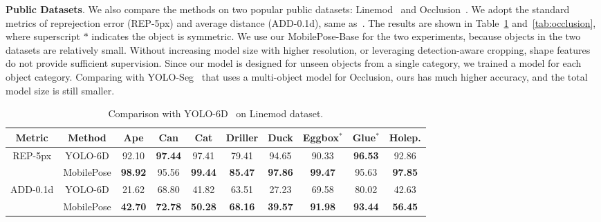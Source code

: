 \documentclass[runningheads]{llncs}
\begin{document}
\textbf{Public Datasets}. We also compare the methods on two popular public datasets: Linemod~\cite{Hinterstoisser_2012_LINEMOD} and Occlusion~\cite{Brachmann_2014_Occlusion}. We adopt the standard metrics of reprejection error (REP-5px) and average distance (ADD-0.1d), same as~\cite{Tekin_2018_SingleShot,Hu_2019_Segmentation}. The results are shown in Table~\ref{tab:linemod} and~\ref{tab:occlusion}, where superscript $*$ indicates the object is symmetric. We use our MobilePose-Base for the two experiments, because objects in the two datasets are relatively small. Without increasing model size with higher resolution, or leveraging detection-aware cropping, shape features do not provide sufficient supervision. Since our model is designed for unseen objects from a single category, we trained a model for each object category. Comparing with YOLO-Seg~\cite{Hu_2019_Segmentation} that uses a multi-object model for Occlusion, ours has much higher accuracy, and the total model size is still smaller.

\begin{table}[t]
\begin{center}
\begin{tabular}{c|c||c|c|c|c|c|c|c|c}\hline
Metric & Method & Ape & Can & Cat & Driller & Duck & Eggbox$^*$ & Glue$^*$ & Holep.\\
\hline
\multirow{2}{*}{REP-5px} &
YOLO-6D &  92.10 & \textbf{97.44} & 97.41 & 79.41 & 94.65 & 90.33 & \textbf{96.53} & 92.86 \\
&MobilePose & \textbf{98.92} & 95.56 & \textbf{99.44} & \textbf{85.47} & \textbf{97.86} & \textbf{99.47} & 95.63 & \textbf{97.85}\\
\hline
\multirow{2}{*}{ADD-0.1d} &
YOLO-6D & 21.62 & 68.80 & 41.82 & 63.51 & 27.23 & 69.58 & 80.02 & 42.63 \\
&MobilePose & \textbf{42.70} & \textbf{72.78} & \textbf{50.28} & \textbf{68.16} & \textbf{39.57} & \textbf{91.98} & \textbf{93.44} & \textbf{56.45} \\
\hline
\end{tabular}
\caption{Comparison with YOLO-6D~\cite{Tekin_2018_SingleShot} on Linemod dataset.}
\label{tab:linemod}
\end{center}
\end{table}
\end{document}
